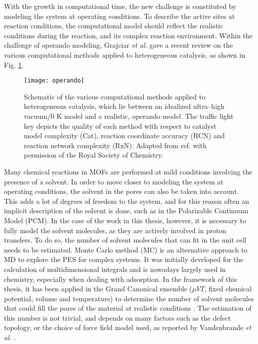 With the growth in computational time, the new challenge is constituted by modeling the system at operating conditions. 
To describe the active sites at reaction conditions, the computational model should reflect the realistic conditions during the reaction, and its complex reaction environment. Within the challenge of operando modeling, Grajciar \textit{et al.} \cite{grajciar2018towards} gave a recent review on the various computational methods applied to heterogeneous catalysis, as shown in Fig. \ref{fig:operando}. 
\npar
\begin{figure}[!htbp]
	\centering
 	\texttt{[image: operando]}
	\caption{Schematic of the various computational methods applied to heterogeneous catalysis, which lie between an idealized ultra--high vacuum/0 K model and a realistic, operando model. The traffic light key depicts the quality of each method with respect to catalyst model complexity (Cat), reaction coordinate accuracy (RCN) and reaction network complexity (RxN). Adapted from ref. \cite{grajciar2018towards} with permission of the Royal Society of Chemistry.}
 \label{fig:operando}
\end{figure}
Many chemical reactions in MOFs are performed at mild conditions involving the presence of a solvent. In order to move closer to modeling the system at operating conditions, the solvent in the pores can also be taken into account. This adds a lot of degrees of freedom to the system, and for this reason often an implicit description of the solvent is done, such as in the Polarizable Continuum Model (PCM)\cite{cances1997new}. In the case of the work in this thesis, however, it is necessary to fully model the solvent molecules, as they are actively involved in proton transfers. To do so, the number of solvent molecules that can fit in the unit cell needs to be estimated. Monte Carlo method (MC) is an alternative approach to MD to explore the PES for complex systems. It was initially developed for the calculation of multidimensional integrals and is nowadays largely used in chemistry, especially when dealing with adsorption. In the framework of this thesis, it has been applied in the Grand Canonical ensemble ($\mu VT$, fixed chemical potential, volume and temperature) to determine the number of solvent molecules that could fill the pores of the material at realistic conditions \cite{dubbeldam2013inner}. The estimation of this number is not trivial, and depends on many factors such as the defect topology, or the choice of force field model used, as reported by Vandenbrande \textit{et al.} \cite{vandenbrande2017methane}.
\npar



